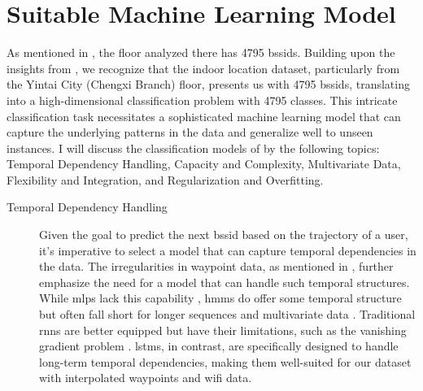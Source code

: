 \chapter{Suitable Machine Learning Model}\label{ch:discuss-ml}

As mentioned in , the floor analyzed there has 4795 \acp{bssid}.
Building upon the insights from , we recognize that the indoor location dataset, particularly from the Yintai City (Chengxi Branch) floor, presents us with 4795 \acp{bssid}, translating into a high-dimensional classification problem with 4795 classes.
This intricate classification task necessitates a sophisticated machine learning model that can capture the underlying patterns in the data and generalize well to unseen instances.
I will discuss the classification models of  by the following topics: Temporal Dependency Handling, Capacity and Complexity, Multivariate Data, Flexibility and Integration, and Regularization and Overfitting. \\

\begin{description}
\item[Temporal Dependency Handling]
Given the goal to predict the next \ac{bssid} based on the trajectory of a user, it's imperative to select a model that can capture temporal dependencies in the data.
The irregularities in waypoint data, as mentioned in , further emphasize the need for a model that can handle such temporal structures.
While \acp{mlp} lack this capability \cite{mlp_and_nn}, \acp{hmm} do offer some temporal structure but often fall short for longer sequences and multivariate data \cite{hmm-rabiner-1989}.
Traditional \acp{rnn} are better equipped but have their limitations, such as the vanishing gradient problem \cite{rnn_difficulties_2013}.
\acp{lstm}, in contrast, are specifically designed to handle long-term temporal dependencies, making them well-suited for our dataset with interpolated waypoints and \ac{wifi} data.
\end{description}

